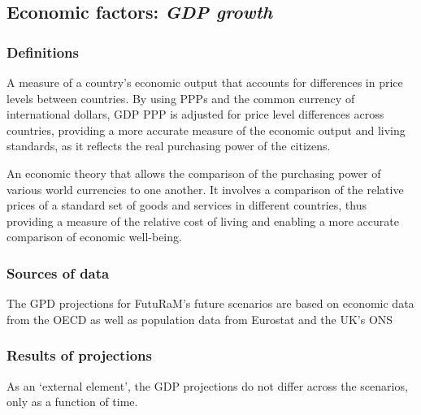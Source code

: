 \subsection{Economic factors: \textit{GDP growth}}\label{sec:quantification_economic}

\subsubsection{Definitions}

\begin{description}[style=nextline]
  \item[Gross Domestic Product (GDP) PPP]
        A measure of a country's economic output that accounts for differences in price levels between countries. By using PPPs and the common currency of international dollars, GDP PPP is adjusted for price level differences across countries, providing a more accurate measure of the economic output and living standards, as it reflects the real purchasing power of the citizens.

  \item[Purchasing Power Parity (PPP)]
        An economic theory that allows the comparison of the purchasing power of various world currencies to one another. It involves a comparison of the relative prices of a standard set of goods and services in different countries, thus providing a measure of the relative cost of living and enabling a more accurate comparison of economic well-being.
\end{description}




\subsubsection{Sources of data}

The GPD projections for FutuRaM's future scenarios are based on economic data from the OECD as well as population data from Eurostat and the UK's ONS~\cite{oecd2021gdpdata,eurostat2023population,ons2023population}

\subsubsection{Results of projections}

As an `external element', the GDP projections do not differ across the scenarios, only as a function of time.

